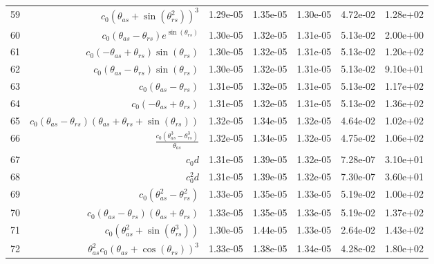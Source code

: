 \begin{tabularx}{\textwidth}{lRRRRRl}
59  &  $ c_{0} \left(\theta_{as} + \sin{\left(\theta_{rs}^{2} \right)}\right)^{3} $  &  1.29e-05  &  1.35e-05  &  1.30e-05  &  4.72e-02  &  1.28e+02  \\ 
60  &  $ c_{0} \left(\theta_{as} - \theta_{rs}\right) e^{\sin{\left(\theta_{rs} \right)}} $  &  1.30e-05  &  1.32e-05  &  1.31e-05  &  5.13e-02  &  2.00e+00  \\ 
61  &  $ c_{0} \left(- \theta_{as} + \theta_{rs}\right) \sin{\left(\theta_{rs} \right)} $  &  1.30e-05  &  1.32e-05  &  1.31e-05  &  5.13e-02  &  1.20e+02  \\ 
62  &  $ c_{0} \left(\theta_{as} - \theta_{rs}\right) \sin{\left(\theta_{rs} \right)} $  &  1.30e-05  &  1.32e-05  &  1.31e-05  &  5.13e-02  &  9.10e+01  \\ 
63  &  $ c_{0} \left(\theta_{as} - \theta_{rs}\right) $  &  1.31e-05  &  1.32e-05  &  1.31e-05  &  5.13e-02  &  1.17e+02  \\ 
64  &  $ c_{0} \left(- \theta_{as} + \theta_{rs}\right) $  &  1.31e-05  &  1.32e-05  &  1.31e-05  &  5.13e-02  &  1.36e+02  \\ 
65  &  $ c_{0} \left(\theta_{as} - \theta_{rs}\right) \left(\theta_{as} + \theta_{rs} + \sin{\left(\theta_{rs} \right)}\right) $  &  1.32e-05  &  1.34e-05  &  1.32e-05  &  4.64e-02  &  1.02e+02  \\ 
66  &  $ \displaystyle\frac{c_{0} \left(\theta_{as}^{3} - \theta_{rs}^{3}\right)}{\theta_{as}} $  &  1.32e-05  &  1.34e-05  &  1.32e-05  &  4.75e-02  &  1.06e+02  \\ 
67  &  $ c_{0} d $  &  1.31e-05  &  1.39e-05  &  1.32e-05  &  7.28e-07  &  3.10e+01  \\ 
68  &  $ c_{0}^{2} d $  &  1.31e-05  &  1.39e-05  &  1.32e-05  &  7.30e-07  &  3.60e+01  \\ 
69  &  $ c_{0} \left(\theta_{as}^{2} - \theta_{rs}^{2}\right) $  &  1.33e-05  &  1.35e-05  &  1.33e-05  &  5.19e-02  &  1.00e+02  \\ 
70  &  $ c_{0} \left(\theta_{as} - \theta_{rs}\right) \left(\theta_{as} + \theta_{rs}\right) $  &  1.33e-05  &  1.35e-05  &  1.33e-05  &  5.19e-02  &  1.37e+02  \\ 
71  &  $ c_{0} \left(\theta_{as}^{2} + \sin{\left(\theta_{rs}^{3} \right)}\right) $  &  1.30e-05  &  1.44e-05  &  1.33e-05  &  2.64e-02  &  1.43e+02  \\ 
72  &  $ \theta_{as}^{2} c_{0} \left(\theta_{as} + \cos{\left(\theta_{rs} \right)}\right)^{3} $  &  1.33e-05  &  1.38e-05  &  1.34e-05  &  4.28e-02  &  1.80e+02  \\ 

\end{tabularx}
